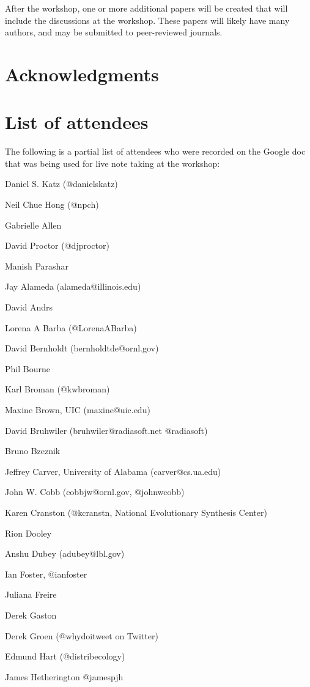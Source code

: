 \documentclass[11pt, oneside]{amsart}
\begin{document}
After the workshop, one or more additional papers will be created that will include the discussions at 
the workshop. These papers will likely have many authors, and may be submitted to peer-reviewed 
journals.


\section*{Acknowledgments}

\appendix
\section{List of attendees}

The following is a partial list of attendees who were recorded on the Google doc that was being used for live note taking at the workshop:

Daniel S. Katz (@danielskatz)

Neil Chue Hong (@npch)

Gabrielle Allen

David Proctor (@djproctor)

Manish Parashar

Jay Alameda (alameda@illinois.edu)

David Andrs

Lorena A Barba (@LorenaABarba)

David Bernholdt (bernholdtde@ornl.gov)

Phil Bourne

Karl Broman (@kwbroman)

Maxine Brown, UIC (maxine@uic.edu)

David Bruhwiler   (bruhwiler@radiasoft.net    @radiasoft)

Bruno Bzeznik

Jeffrey Carver, University of Alabama (carver@cs.ua.edu)

John W. Cobb (cobbjw@ornl.gov, @johnwcobb)

Karen Cranston (@kcranstn, National Evolutionary Synthesis Center)

Rion Dooley

Anshu Dubey (adubey@lbl.gov)

Ian Foster, @ianfoster

Juliana Freire

Derek Gaston

Derek Groen (@whydoitweet on Twitter)

Edmund Hart (@distribecology)

James Hetherington @jamespjh
\end{document}
